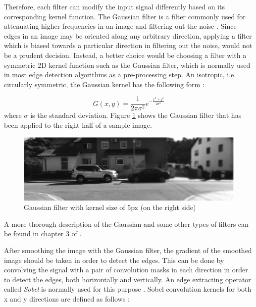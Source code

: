 Therefore, each filter can modify the input signal differently based on its corresponding kernel function.
The Gaussian filter is a filter commonly used for attenuating higher frequencies in an image and filtering out the noise \cite{wells86}. 
Since edges in an image may be oriented along any arbitrary direction, 
applying a filter which is biased towards a particular direction in filtering out the noise, would not be a prudent decision. Instead, a better choice would be choosing a filter 
with a symmetric 2D kernel function such as the Gaussian filter, which is normally used in most edge detection algorithms as a pre-processing step. 
An isotropic, i.e. circularly symmetric, the Gaussian kernel has the following form \cite{sze11}:

\begin{equation}
G(x,y)=\frac{1}{2\pi \sigma ^{2}} e^{-\frac{x^{2}+y^{2}}{2\sigma^{2}}}
\end{equation}
where $\sigma$ is the standard deviation. 
Figure \ref{fig:gauss} shows the Gaussian filter that has been applied to the right half of a sample image.

\begin{figure}[H]
\centering
\includegraphics[scale=0.43]{left5Gblur}
\caption{Gaussian filter with kernel size of 5px (on the right side)}
\label{fig:gauss}
\end{figure} 


A more thorough description of the Gaussian and some other types of filters can be found in chapter 3 of \cite{sze11}.

After smoothing the image with the Gaussian filter, the gradient of the smoothed image should be taken in order to detect the edges. This can be done by convolving 
the signal with a pair of convolution masks in each direction in order to detect the edges, both horizontally and vertically. An edge extracting operator called {\it Sobel} is normally used
for this purpose \cite{sobel78}. 
Sobel convolution kernels for both x and y directions are defined as follows \cite{sobel78}:

